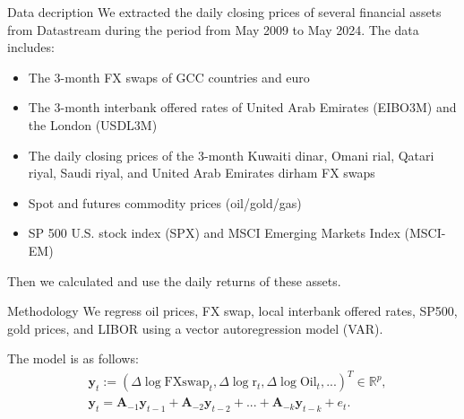 \documentclass{beamer}
\newcommand{\matr}[1]{\mathbf{#1}}
\begin{document}
\begin{frame}{Data decription}
We extracted the daily closing prices of several financial assets from Datastream during the period from May 2009 to May 2024. The data includes:
\begin{itemize}
    \item The 3-month FX swaps of GCC countries and euro
    \item The 3-month interbank offered rates of United Arab Emirates (EIBO3M) and the London (USDL3M)
    \item The daily closing prices of the 3-month Kuwaiti dinar, Omani rial, Qatari riyal, Saudi riyal, and United Arab Emirates dirham FX swaps
    \item Spot and futures commodity prices (oil/gold/gas) 
    \item SP 500 U.S. stock index (SPX) and MSCI Emerging Markets Index (MSCI-EM)
\end{itemize}
Then we calculated and use the daily returns of these assets.
\end{frame}

\begin{frame}{Methodology}
We regress oil prices, FX swap, local interbank offered rates, SP500, gold prices, and LIBOR using a vector autoregression model (VAR).

The model is as follows:
\begin{equation*}
    \begin{aligned}
    &\matr{y}_t := (\Delta \log \text{FXswap}_t, \Delta \log \text{r}_t, \Delta \log \text{Oil}_t, ...)^T \in \mathbb{R}^p, \\
    &\matr{y}_t = \matr{A}_{-1}\matr{y}_{t-1}+\matr{A}_{-2}\matr{y}_{t-2}+...+\matr{A}_{-k}\matr{y}_{t-k}+e_t.
    \end{aligned}
\end{equation*}

\end{frame}
\end{document}

